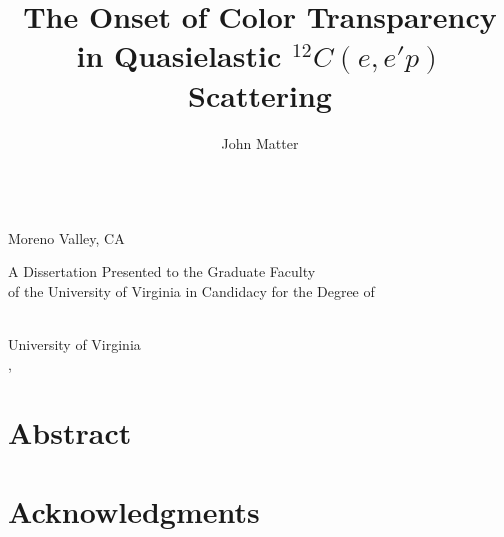 \title{The Onset of Color Transparency in Quasielastic ${}^{12}C(e,e'p)$ Scattering}
\makeatletter
\bookmark[named=FirstPage]{\@title}
\makeatother

\makeatletter
\author{John Matter} \let\Author\@author
\newcommand{\hometown}{Moreno Valley, CA}

 \let\Year\@degreeyear
{}
\makeatother


\makeatletter
\def\maketitle{\begin{titlepage}
\doublespacing
\vspace{0.0in}
\large
{\LARGE\bf \@title \par}
\@author \\
\hometown
\par
\@prevdegrees
\par
A Dissertation Presented to the Graduate Faculty \\
of the University of Virginia in Candidacy for the Degree of \\
\@degree
\par
\@department \\
University of Virginia \\
\@degreemonth, \@degreeyear \\
\vspace{1.0in}

\begin{flushright}
\begin{minipage}{0.45\linewidth}
\mysignrule{}
\mysignrule{}
\mysignrule{}
\mysignrule{}
\end{minipage}
\end{flushright}

\end{titlepage}}
\makeatother
\maketitle


\cleardoublepage

\vspace{0.8in}
\section*{\center Abstract}


\cleardoublepage

\section*{Acknowledgments}

